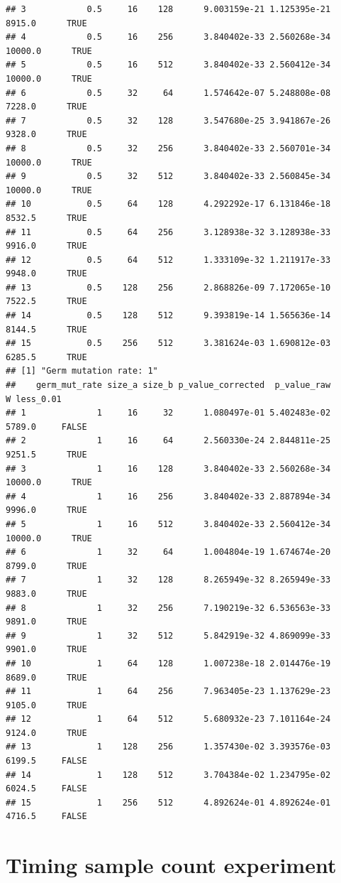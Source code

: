 \documentclass[]{book}
\begin{document}
\begin{verbatim}
## 3            0.5     16    128      9.003159e-21 1.125395e-21  8915.0      TRUE
## 4            0.5     16    256      3.840402e-33 2.560268e-34 10000.0      TRUE
## 5            0.5     16    512      3.840402e-33 2.560412e-34 10000.0      TRUE
## 6            0.5     32     64      1.574642e-07 5.248808e-08  7228.0      TRUE
## 7            0.5     32    128      3.547680e-25 3.941867e-26  9328.0      TRUE
## 8            0.5     32    256      3.840402e-33 2.560701e-34 10000.0      TRUE
## 9            0.5     32    512      3.840402e-33 2.560845e-34 10000.0      TRUE
## 10           0.5     64    128      4.292292e-17 6.131846e-18  8532.5      TRUE
## 11           0.5     64    256      3.128938e-32 3.128938e-33  9916.0      TRUE
## 12           0.5     64    512      1.333109e-32 1.211917e-33  9948.0      TRUE
## 13           0.5    128    256      2.868826e-09 7.172065e-10  7522.5      TRUE
## 14           0.5    128    512      9.393819e-14 1.565636e-14  8144.5      TRUE
## 15           0.5    256    512      3.381624e-03 1.690812e-03  6285.5      TRUE
## [1] "Germ mutation rate: 1"
##    germ_mut_rate size_a size_b p_value_corrected  p_value_raw       W less_0.01
## 1              1     16     32      1.080497e-01 5.402483e-02  5789.0     FALSE
## 2              1     16     64      2.560330e-24 2.844811e-25  9251.5      TRUE
## 3              1     16    128      3.840402e-33 2.560268e-34 10000.0      TRUE
## 4              1     16    256      3.840402e-33 2.887894e-34  9996.0      TRUE
## 5              1     16    512      3.840402e-33 2.560412e-34 10000.0      TRUE
## 6              1     32     64      1.004804e-19 1.674674e-20  8799.0      TRUE
## 7              1     32    128      8.265949e-32 8.265949e-33  9883.0      TRUE
## 8              1     32    256      7.190219e-32 6.536563e-33  9891.0      TRUE
## 9              1     32    512      5.842919e-32 4.869099e-33  9901.0      TRUE
## 10             1     64    128      1.007238e-18 2.014476e-19  8689.0      TRUE
## 11             1     64    256      7.963405e-23 1.137629e-23  9105.0      TRUE
## 12             1     64    512      5.680932e-23 7.101164e-24  9124.0      TRUE
## 13             1    128    256      1.357430e-02 3.393576e-03  6199.5     FALSE
## 14             1    128    512      3.704384e-02 1.234795e-02  6024.5     FALSE
## 15             1    256    512      4.892624e-01 4.892624e-01  4716.5     FALSE
\end{verbatim}

\hypertarget{timing-sample-count-experiment}{%
\chapter{Timing sample count experiment}\label{timing-sample-count-experiment}}
\end{document}
